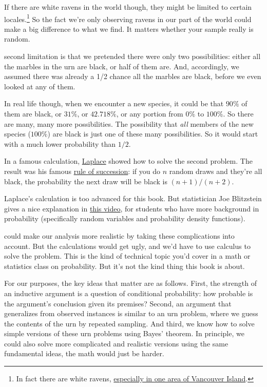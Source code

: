 \documentclass[justified]{tufte-book}
\theoremstyle{definition}
\theoremstyle{definition}
\theoremstyle{definition}
\theoremstyle{remark}
\begin{document}
If there are white ravens in the world though, they might be limited to
certain locales.\footnote{In fact there are white ravens,
  \href{https://vancouversun.com/news/local-news/rare-white-raven-spotted-on-vancouver-island}{especially
  in one area of Vancouver Island}.} So the fact we're only observing
ravens in our part of the world could make a big difference to what we
find. It matters whether your sample really is random.

 second limitation is that we pretended there were only
two possibilities: either all the marbles in the urn are black, or half
of them are. And, accordingly, we assumed there was already a 1/2 chance
all the marbles are black, before we even looked at any of them.

In real life though, when we encounter a new species, it could be that
\(90\%\) of them are black, or \(31\%\), or \(42.718\%\), or any portion
from \(0\%\) to \(100\%\). So there are many, many more possibilities.
The possibility that \emph{all} members of the new species (\(100\%\))
are black is just one of these many possibilities. So it would start
with a much lower probability than \(1/2\).

\begin{marginfigure}
In a famous calculation, \protect\hyperlink{fig:laplace}{Laplace} showed
how to solve the second problem. The result was his famous
\href{https://en.wikipedia.org/wiki/Rule_of_succession}{rule of
succession}: if you do \(n\) random draws and they're all black, the
probability the next draw will be black is \((n+1)/(n+2)\).

Laplace's calculation is too advanced for this book. But statistician
Joe Blitzstein gives a nice explanation in
\href{https://www.youtube.com/watch?v=N8O6zd6vTZ8\&list=EC2SOU6wwxB0uwwH80KTQ6ht66KWxbzTIo}{this
video}, for students who have more background in probability
(specifically random variables and probability density functions).
\end{marginfigure}

 could make our analysis more realistic by taking these
complications into account. But the calculations would get ugly, and
we'd have to use calculus to solve the problem. This is the kind of
technical topic you'd cover in a math or statistics class on
probability. But it's not the kind thing this book is about.

For our purposes, the key ideas that matter are as follows. First, the
strength of an inductive argument is a question of conditional
probability: how probable is the argument's conclusion given its
premises? Second, an argument that generalizes from observed instances
is similar to an urn problem, where we guess the contents of the urn by
repeated sampling. And third, we know how to solve simple versions of
these urn problems using Bayes' theorem. In principle, we could also
solve more complicated and realistic versions using the same fundamental
ideas, the math would just be harder.
\end{document}
